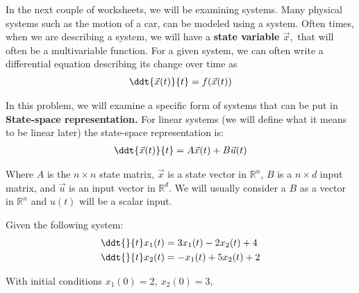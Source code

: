 

In the next couple of worksheets, we will be examining systems. 
Many physical systems such as the motion of a car, can be modeled using a system.
Often times, when we are describing a system, we will have a \textbf{state variable $\vec{x},$}
that will often be a multivariable function. 
For a given system, we can often write a differential equation describing its change over time as
\begin{align}
\ddt{\vec{x}(t)}{t} = f(\vec{x}(t))
\end{align}

In this problem, we will examine a specific form of systems that can be put in \textbf{State-space representation.} \vspace{0.5 cm}
For linear systems (we will define what it means to be linear later) the state-space representation is:
\begin{align}
\ddt{\vec{x}(t)}{t} = A \vec{x}(t) + B \vec{u}(t)
\end{align}

Where $A$ is the $n \times n$ state matrix, $\vec{x}$ is a state vector in $\mathbb{R}^n$, $B$ is a $n \times d$ input matrix, and $\vec{u}$ is an input vector in $\mathbb{R}^d$. We will usually consider a $B$ as a vector in $\mathbb{R}^n$ and $u(t)$ will be a scalar input.

Given the following system:
\begin{align*}
    \ddt{}{t}x_{1}(t) &= 3 x_{1}(t) - 2 x_{2}(t) + 4 \\
    \ddt{}{t}x_{2}(t) &= - x_{1}(t) + 5 x_{2}(t) + 2
\end{align*}

With initial conditions $x_{1}(0) = 2, \ x_{2}(0) = 3,$

